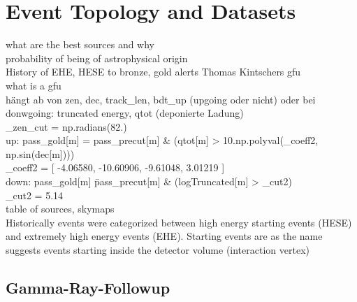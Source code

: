 \chapter{Event Topology and Datasets}
what are the best sources and why\\
probability of being of astrophysical origin\\
History of EHE, HESE to bronze, gold alerts Thomas Kintschers gfu\\
what is a gfu\\
hängt ab von zen, dec, track\_len, bdt\_up (upgoing oder nicht) oder bei donwgoing: truncated energy, qtot (deponierte Ladung)\\
\_zen\_cut = np.radians(82.)\\
up: pass\_gold[m]   = pass\_precut[m] \& (qtot[m] > 10.\*\*np.polyval(\_coeff2, np.sin(dec[m])))\\
\_coeff2 = [  -4.06580, -10.60906,  -9.61048,   3.01219 ]\\
down: pass\_gold[m]   \= pass\_precut[m] \& (logTruncated[m] > \_cut2)\\
\_cut2   = 5.14\\

table of sources, skymaps\\

Historically events were categorized between high energy starting events (HESE) and extremely high energy events (EHE).
Starting events are as the name suggests events starting inside the detector volume (interaction vertex)

\cite{Aartsen_2017}

\section{Gamma-Ray-Followup}
